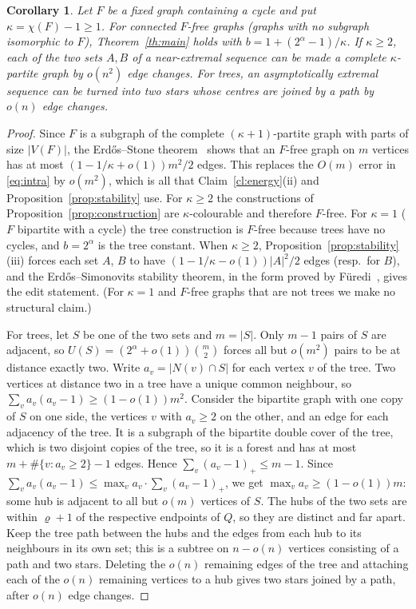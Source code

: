 \documentclass[11pt,a4paper]{article}
\newtheorem{corollary}[theorem]{Corollary}
\theoremstyle{definition}
\begin{document}
\begin{corollary}\label{cor:forbidden}
Let $F$ be a fixed graph containing a cycle and put $\kappa=\chi(F)-1\ge1$. For connected $F$-free graphs (graphs with no subgraph isomorphic to $F$), Theorem~\ref{th:main} holds with $b=1+(2^\alpha-1)/\kappa$. If $\kappa\ge2$, each of the two sets $A,B$ of a near-extremal sequence can be made a complete $\kappa$-partite graph by $o(n^2)$ edge changes. For trees, an asymptotically extremal sequence can be turned into two stars whose centres are joined by a path by $o(n)$ edge changes.
\end{corollary}
\begin{proof}
Since $F$ is a subgraph of the complete $(\kappa+1)$-partite graph with parts of size $|V(F)|$, the Erd\H os--Stone theorem~\cite{es} shows that an $F$-free graph on $m$ vertices has at most $(1-1/\kappa+o(1))m^2/2$ edges. This replaces the $O(m)$ error in \eqref{eq:intra} by $o(m^2)$, which is all that Claim~\ref{cl:energy}(ii) and Proposition~\ref{prop:stability} use. For $\kappa\ge2$ the constructions of Proposition~\ref{prop:construction} are $\kappa$-colourable and therefore $F$-free. For $\kappa=1$ ($F$ bipartite with a cycle) the tree construction is $F$-free because trees have no cycles, and $b=2^\alpha$ is the tree constant. When $\kappa\ge2$, Proposition~\ref{prop:stability}(iii) forces each set $A$, $B$ to have $(1-1/\kappa-o(1))|A|^2/2$ edges (resp.\ for $B$), and the Erd\H os--Simonovits stability theorem, in the form proved by F\"uredi~\cite{furedi}, gives the edit statement. (For $\kappa=1$ and $F$-free graphs that are not trees we make no structural claim.)

For trees, let $S$ be one of the two sets and $m=|S|$. Only $m-1$ pairs of $S$ are adjacent, so $U(S)=(2^\alpha+o(1))\binom m2$ forces all but $o(m^2)$ pairs to be at distance exactly two. Write $a_v=|N(v)\cap S|$ for each vertex $v$ of the tree. Two vertices at distance two in a tree have a unique common neighbour, so $\sum_va_v(a_v-1)\ge(1-o(1))m^2$. Consider the bipartite graph with one copy of $S$ on one side, the vertices $v$ with $a_v\ge2$ on the other, and an edge for each adjacency of the tree. It is a subgraph of the bipartite double cover of the tree, which is two disjoint copies of the tree, so it is a forest and has at most $m+\#\{v:a_v\ge2\}-1$ edges. Hence $\sum_v(a_v-1)_+\le m-1$. Since $\sum_va_v(a_v-1)\le\max_va_v\cdot\sum_v(a_v-1)_+$, we get $\max_va_v\ge(1-o(1))m$: some hub is adjacent to all but $o(m)$ vertices of $S$. The hubs of the two sets are within $\varrho+1$ of the respective endpoints of $Q$, so they are distinct and far apart. Keep the tree path between the hubs and the edges from each hub to its neighbours in its own set; this is a subtree on $n-o(n)$ vertices consisting of a path and two stars. Deleting the $o(n)$ remaining edges of the tree and attaching each of the $o(n)$ remaining vertices to a hub gives two stars joined by a path, after $o(n)$ edge changes.
\end{proof}
\end{document}
